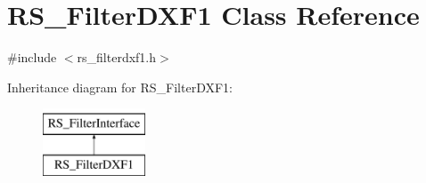 \hypertarget{classRS__FilterDXF1}{\section{R\-S\-\_\-\-Filter\-D\-X\-F1 Class Reference}
\label{classRS__FilterDXF1}
}


{\ttfamily \#include $<$rs\-\_\-filterdxf1.\-h$>$}

Inheritance diagram for R\-S\-\_\-\-Filter\-D\-X\-F1\-:\begin{figure}[H]
\begin{center}
\leavevmode
\includegraphics[height=2.000000cm]{classRS__FilterDXF1}
\end{center}
\end{figure}
